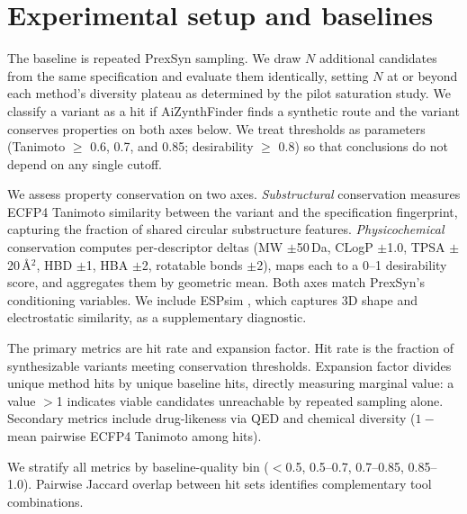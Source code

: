 \section*{Experimental setup and baselines}

The baseline is repeated PrexSyn sampling. We draw $N$ additional candidates from the same specification and evaluate them identically, setting $N$ at or beyond each method's diversity plateau as determined by the pilot saturation study. We classify a variant as a hit if AiZynthFinder finds a synthetic route and the variant conserves properties on both axes below. We treat thresholds as parameters (Tanimoto $\geq$ 0.6, 0.7, and 0.85; desirability $\geq$ 0.8) so that conclusions do not depend on any single cutoff.

We assess property conservation on two axes. \textit{Substructural} conservation measures ECFP4 Tanimoto similarity between the variant and the specification fingerprint, capturing the fraction of shared circular substructure features. \textit{Physicochemical} conservation computes per-descriptor deltas (MW $\pm$50\,Da, CLogP $\pm$1.0, TPSA $\pm$20\,\AA$^2$, HBD $\pm$1, HBA $\pm$2, rotatable bonds $\pm$2), maps each to a 0--1 desirability score, and aggregates them by geometric mean. Both axes match PrexSyn's conditioning variables. We include ESPsim \cite{bib12}, which captures 3D shape and electrostatic similarity, as a supplementary diagnostic.

The primary metrics are hit rate and expansion factor. Hit rate is the fraction of synthesizable variants meeting conservation thresholds. Expansion factor divides unique method hits by unique baseline hits, directly measuring marginal value: a value $>$1 indicates viable candidates unreachable by repeated sampling alone. Secondary metrics include drug-likeness via QED \cite{bib13} and chemical diversity ($1 -$ mean pairwise ECFP4 Tanimoto among hits).

We stratify all metrics by baseline-quality bin ($<$0.5, 0.5--0.7, 0.7--0.85, 0.85--1.0). Pairwise Jaccard overlap between hit sets identifies complementary tool combinations.
